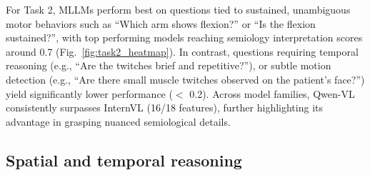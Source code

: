 \documentclass{article}
\theoremstyle{plain}
\theoremstyle{definition}
\theoremstyle{remark}
\begin{document}
For Task 2, MLLMs perform best on questions tied to sustained, unambiguous motor behaviors such as “Which arm shows
flexion?” or “Is the flexion sustained?”, with top performing models reaching semiology interpretation scores around 0.7 (Fig.~\ref{fig:task2_heatmap}). In contrast, questions requiring temporal reasoning (e.g., “Are the twitches brief and repetitive?”), or subtle motion detection (e.g., “Are there small muscle twitches observed on the patient’s face?”) yield significantly lower performance ($<$ 0.2). Across model families, Qwen-VL consistently surpasses InternVL (16/18 features), further highlighting its advantage in grasping nuanced semiological details.

\subsection{Spatial and temporal reasoning}
\end{document}
